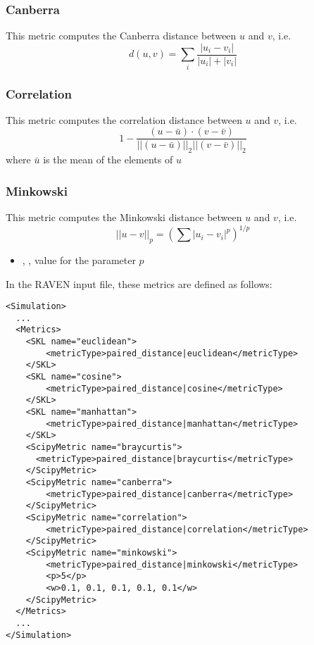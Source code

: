 \subsubsection{Canberra}
This metric computes the Canberra distance between $u$ and $v$, i.e.
\begin{equation}
  d(u,v) = \sum_i \frac{|u_i-v_i|}{|u_i|+|v_i|}
\end{equation}


\subsubsection{Correlation}
This metric computes the correlation distance between $u$ and $v$, i.e.
\begin{equation}
  1 - \frac{(u - \bar{u}) \cdot (v - \bar{v})}{{||(u - \bar{u})||}_2 {||(v - \bar{v})||}_2}
\end{equation}
where $\bar{u}$ is the mean of the elements of $u$


\subsubsection{Minkowski}
This metric computes the Minkowski distance between $u$ and $v$, i.e.
\begin{equation}
  {||u-v||}_p = (\sum{|u_i - v_i|^p})^{1/p}
\end{equation}


\begin{itemize}
  \item {}, , value for the parameter $p$
\end{itemize}

In the RAVEN input file, these metrics are defined as follows:
\begin{lstlisting}[style=XML]
<Simulation>
  ...
  <Metrics>
    <SKL name="euclidean">
        <metricType>paired_distance|euclidean</metricType>
    </SKL>
    <SKL name="cosine">
        <metricType>paired_distance|cosine</metricType>
    </SKL>
    <SKL name="manhattan">
        <metricType>paired_distance|manhattan</metricType>
    </SKL>
    <ScipyMetric name="braycurtis">
      <metricType>paired_distance|braycurtis</metricType>
    </ScipyMetric>
    <ScipyMetric name="canberra">
        <metricType>paired_distance|canberra</metricType>
    </ScipyMetric>
    <ScipyMetric name="correlation">
        <metricType>paired_distance|correlation</metricType>
    </ScipyMetric>
    <ScipyMetric name="minkowski">
        <metricType>paired_distance|minkowski</metricType>
        <p>5</p>
        <w>0.1, 0.1, 0.1, 0.1, 0.1</w>
    </ScipyMetric>
  </Metrics>
  ...
</Simulation>
\end{lstlisting}

